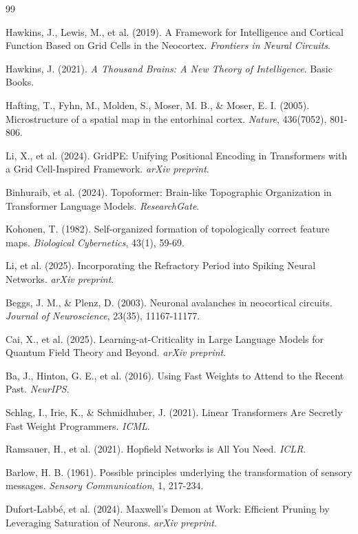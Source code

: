 \documentclass[11pt, letterpaper]{article}
\begin{document}
\begin{thebibliography}{99}

 Hawkins, J., Lewis, M., et al. (2019). A Framework for Intelligence and Cortical Function Based on Grid Cells in the Neocortex. 
\textit{Frontiers in Neural Circuits}.

 Hawkins, J. (2021). \textit{A Thousand Brains: A New 
Theory of Intelligence}. Basic Books.

 Hafting, T., Fyhn, M., Molden, S., Moser, M. B., \& 
Moser, E. I. (2005). Microstructure of a spatial map in the entorhinal cortex. 
\textit{Nature}, 436(7052), 801-806.

 Li, X., et al. (2024). GridPE: Unifying Positional Encoding in Transformers with a Grid Cell-Inspired Framework. \textit{arXiv preprint}.

 Binhuraib, et al. (2024). Topoformer: Brain-like 
Topographic Organization in Transformer Language Models. \textit{ResearchGate}.

 Kohonen, T. (1982). Self-organized formation of 
topologically correct feature maps. \textit{Biological Cybernetics}, 43(1), 
59-69.

 Li, et al. (2025). Incorporating the Refractory Period into Spiking Neural Networks. \textit{arXiv preprint}.

 Beggs, J. M., \& Plenz, D. (2003). Neuronal avalanches in neocortical circuits. \textit{Journal of Neuroscience}, 23(35), 11167-11177.

 Cai, X., et al. (2025). Learning-at-Criticality in Large Language Models for Quantum Field Theory and Beyond. \textit{arXiv preprint}.

 Ba, J., Hinton, G. E., et al. (2016). Using Fast Weights to Attend to the Recent Past. \textit{NeurIPS}.

 Schlag, I., Irie, K., \& Schmidhuber, J. (2021). Linear Transformers Are Secretly Fast Weight Programmers. \textit{ICML}.

 Ramsauer, H., et al. (2021). Hopfield Networks is All You 
Need. \textit{ICLR}.

 Barlow, H. B. (1961). Possible principles underlying the transformation of sensory messages. \textit{Sensory Communication}, 1, 
217-234.

 Dufort-Labbé, et al. (2024). Maxwell's Demon at Work: Efficient Pruning by Leveraging Saturation of Neurons. \textit{arXiv preprint}.


\end{thebibliography}
\end{document}
